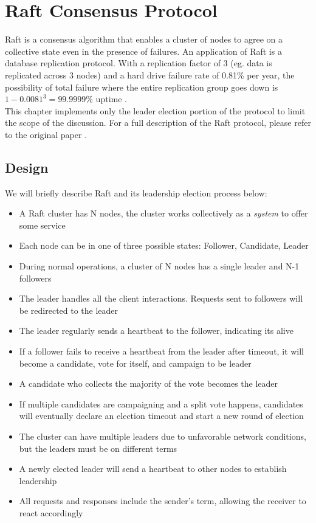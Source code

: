 
% 

\chapter{Raft Consensus Protocol}

Raft is a consensus algorithm that enables a cluster of nodes to agree on a
collective state even in the presence of failures. An application of Raft is
a database replication protocol. With a replication factor of 3 (eg. data is
replicated across 3 nodes) and a hard drive failure rate of 0.81\% per year, the
possibility of total failure where the entire replication group goes down is
$1-0.0081^3 = 99.9999\%$ uptime \cite{backblaze}.\\

This chapter implements only the leader election portion of the protocol to
limit the scope of the discussion. For a full description of the Raft
protocol, please refer to the original paper \cite{raft}.\\

\section{Design}

We will briefly describe Raft and its leadership election process below: 
\begin{itemize}
    \item A Raft cluster has N nodes, the cluster works collectively as a
    \textit{system} to offer some service
    \item Each node can be in one of three possible states: Follower, Candidate, Leader
    \item During normal operations, a cluster of N nodes has a single leader
    and N-1 followers
    \item The leader handles all the client interactions. Requests sent to followers will be 
    redirected to the leader
    \item The leader regularly sends a heartbeat to the follower, indicating its
    alive
    \item If a follower fails to receive a heartbeat from the leader after
    timeout, it will become a candidate, vote for itself, and campaign to be
    leader
    \item A candidate who collects the majority of the vote becomes the leader
    \item If multiple candidates are campaigning and a split vote happens,
    candidates will eventually declare an election timeout and start a new round of
    election
    \item The cluster can have multiple leaders due to unfavorable network conditions, 
    but the leaders must be on different terms 
    \item A newly elected leader will send a heartbeat to other nodes to establish 
    leadership 
    \item All requests and responses include the sender's term, allowing the
    receiver to react accordingly
\end{itemize}

